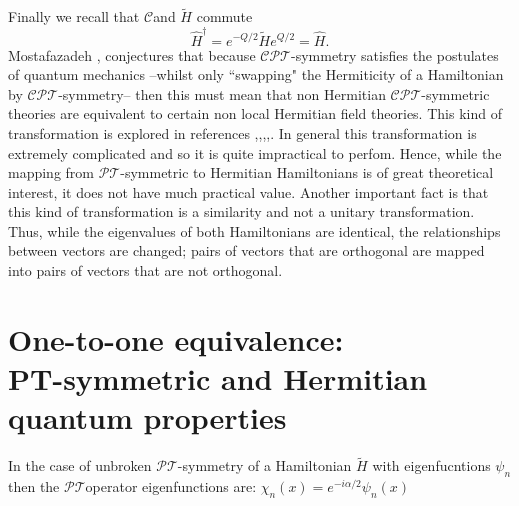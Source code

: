 \documentclass[12pt, a4paper]{report}
\newcommand\PT{\(\mathcal{PT}\)}
\newcommand\CPT{\(\mathcal{CPT}\)}
\newcommand\CC{\(\mathcal{C}\)}
\begin{document}
Finally we recall that \CC\:and $\tilde{H}$ commute
\begin{equation}\label{eq:2.6}
\hat{H}^{\dagger} = e^{-Q/2}\tilde{H}e^{Q/2} = \hat{H}.
\end{equation}
Mostafazadeh \cite{Mostafazadeh}, conjectures that because \CPT-symmetry satisfies the postulates of quantum mechanics --whilst only ``swapping" the Hermiticity of a Hamiltonian by \CPT-symmetry-- then this must mean that non Hermitian \CPT-symmetric theories are equivalent to certain non local Hermitian field theories. This kind of transformation is explored in references \cite{Mostafazadeh},\cite{EquivalentHH},\cite{Pseudo-HermiticityIII},\cite{Jones_2005},\cite{taleof2potentials}.
In general this transformation is extremely complicated and so it is quite impractical to perfom. Hence, while the mapping from \PT-symmetric to Hermitian Hamiltonians is of great theoretical interest, it does not have much practical value\cite{MakingSense}. Another important fact is that this kind of transformation is a similarity and not a unitary transformation. Thus, while the eigenvalues of both Hamiltonians are identical, the relationships between
vectors are changed; pairs of vectors that are orthogonal are mapped into pairs of vectors that are not orthogonal\cite{MakingSense}\cite{Bender_2007}.

\section*{One-to-one equivalence:\\ PT-symmetric and Hermitian quantum properties}\label{}

In the case of unbroken \PT-symmetry of a Hamiltonian $\tilde{H}$ with eigenfucntions $\psi_n$ then the \PT\:operator eigenfunctions are: $\chi_{n}(x) = e^{-i\alpha/2}\psi_n(x)$\\
\end{document}
